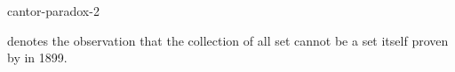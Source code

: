 \documentclass{stex}
\begin{document}
\begin{smodule}{cantor-paradox-2}
\begin{sparagraph}[style=symdoc]
   denotes the observation that the collection of all set cannot be a set itself proven by  in 1899.
\end{sparagraph}
\end{smodule}
\end{document}

